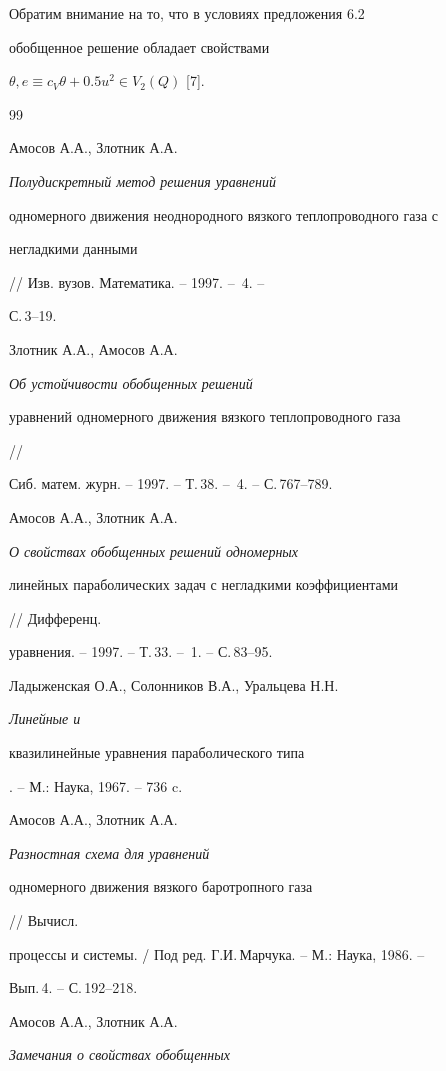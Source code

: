 Обратим внимание на то, что в условиях предложения 6.2


обобщенное решение обладает свойствами


$\theta, e\equiv c_V\theta+0.5u^2\in V_2(Q)$ [7].





\begin{thebibliography}{99}







Амосов А.А., Злотник А.А. {\em Полудискретный метод решения уравнений


одномерного движения неоднородного вязкого теплопроводного газа с


негладкими данными} // Изв. вузов. Математика. -- 1997. -- \No\,4. --


С.\,3--19.




Злотник А.А., Амосов А.А. {\em Об устойчивости обобщенных решений


уравнений одномерного движения вязкого теплопроводного газа} //


Сиб. матем. журн. -- 1997. -- Т.\,38. -- \No\,4. -- С.\,767--789.




Амосов А.А., Злотник А.А. {\em О свойствах обобщенных решений одномерных


линейных параболических задач с негладкими коэффициентами} // Дифференц.


уравнения. -- 1997. -- Т.\,33. -- \No\,1. -- С.\,83--95.




Ладыженская О.А., Солонников В.А., Уральцева Н.Н. {\em Линейные и


квазилинейные уравнения параболического типа}. -- М.: Наука, 1967. -- 736 c.




Амосов А.А., Злотник А.А. {\em Разностная схема для уравнений


одномерного движения вязкого баротропного газа} // Вычисл.


процессы и системы. / Под ред. Г.И.\,Марчука. -- М.: Наука, 1986. --


Вып.\,4. -- С.\,192--218.




Амосов А.А., Злотник А.А. {\em Замечания о свойствах обобщенных


}
\end{thebibliography}
